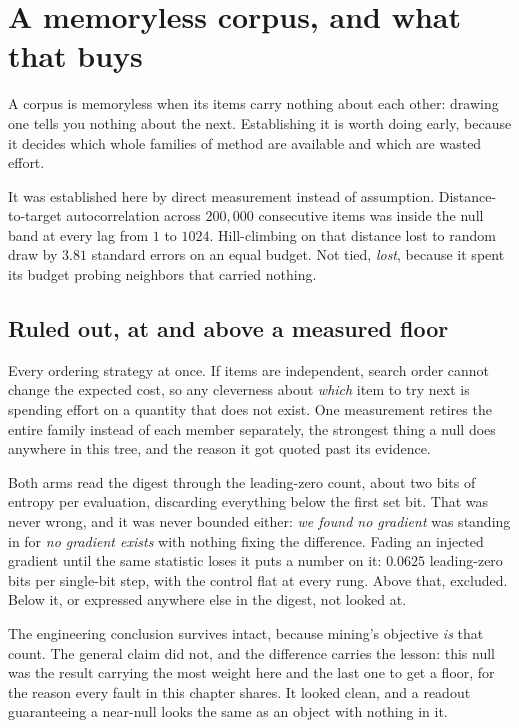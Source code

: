 \section{A memoryless corpus, and what that buys}

A corpus is memoryless when its items carry nothing about each other: drawing one tells you nothing about the next. Establishing it is worth doing early, because it decides which whole families of method are available and which are wasted effort.

It was established here by direct measurement instead of assumption. Distance-to-target autocorrelation across \(200{,}000\) consecutive items was inside the null band at every lag from \(1\) to \(1024\). Hill-climbing on that distance lost to random draw by \(3.81\) standard errors on an equal budget. Not tied, \emph{lost}, because it spent its budget probing neighbors that carried nothing.

\subsection{Ruled out, at and above a measured floor}

Every ordering strategy at once. If items are independent, search order cannot change the expected cost, so any cleverness about \emph{which} item to try next is spending effort on a quantity that does not exist. One measurement retires the entire family instead of each member separately, the strongest thing a null does anywhere in this tree, and the reason it got quoted past its evidence.

Both arms read the digest through the leading-zero count, about two bits of entropy per evaluation, discarding everything below the first set bit. That was never wrong, and it was never bounded either: \emph{we found no gradient} was standing in for \emph{no gradient exists} with nothing fixing the difference. Fading an injected gradient until the same statistic loses it puts a number on it: \(0.0625\) leading-zero bits per single-bit step, with the control flat at every rung. Above that, excluded. Below it, or expressed anywhere else in the digest, not looked at.

The engineering conclusion survives intact, because mining's objective \emph{is} that count. The general claim did not, and the difference carries the lesson: this null was the result carrying the most weight here and the last one to get a floor, for the reason every fault in this chapter shares. It looked clean, and a readout guaranteeing a near-null looks the same as an object with nothing in it.

